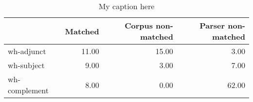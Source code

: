 \begin{table}[!ht]
\centering
\begin{tabular}{lrrr}
\toprule
{} &  Matched &  Corpus non-matched &  Parser non-matched \\
\midrule
wh-adjunct    &    11.00 &               15.00 &                3.00 \\
wh-subject    &     9.00 &                3.00 &                7.00 \\
wh-complement &     8.00 &                0.00 &               62.00 \\
\bottomrule
\end{tabular}
\caption{My caption here}
\label{tab:WH-ocd-data}
\end{table}